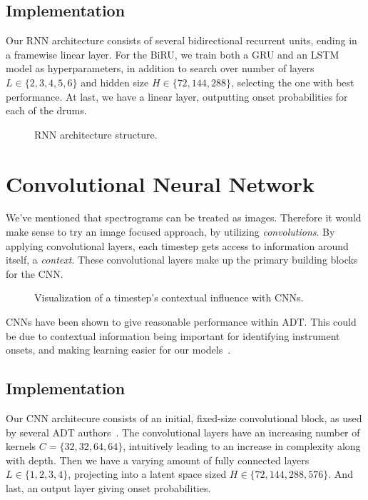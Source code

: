 \subsection{Implementation}

Our \gls{RNN} architecture consists of several bidirectional recurrent units, ending in a framewise linear layer. For the \gls{BiRU}, we train both a \gls{GRU} and an \gls{LSTM} model as hyperparameters, in addition to search over number of layers $L \in \{2, 3, 4, 5, 6\}$ and hidden size $H \in \{72, 144, 288\}$, selecting the one with best performance. At last, we have a linear layer, outputting onset probabilities for each of the drums.

\begin{figure}[H]
    \centering
    
    \caption{RNN architecture structure.}
    \label{RNNFigure}
\end{figure}

\section{Convolutional Neural Network}

We've mentioned that spectrograms can be treated as images. Therefore it would make sense to try an image focused approach, by utilizing \textit{convolutions}. By applying convolutional layers, each timestep gets access to information around itself, a \textit{context}. These convolutional layers make up the primary building blocks for the \gls{CNN}.

\begin{figure}[H]
    \centering
    
    \caption{Visualization of a timestep's contextual influence with CNNs.}
    \label{CNNInfluenceFigure}
\end{figure}

\gls{CNN}s have been shown to give reasonable performance within \gls{ADT}. This could be due to contextual information being important for identifying instrument onsets, and making learning easier for our models~\cite{Vogl2017DrumTV}.

\subsection{Implementation}

Our \gls{CNN} architecure consists of an initial, fixed-size convolutional block, as used by several \gls{ADT} authors~\cite{Vogl2017DrumTV, signals4040042}. The convolutional layers have an increasing number of kernels $C = \{32, 32, 64, 64\}$, intuitively leading to an increase in complexity along with depth. Then we have a varying amount of fully connected layers $L \in \{1, 2, 3, 4\}$, projecting into a latent space sized $H \in \{72, 144, 288, 576\}$. And last, an output layer giving onset probabilities.

